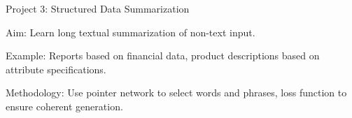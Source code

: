 \documentclass{beamer}
\let\tempone\itemize
\let\temptwo\enditemize
\renewenvironment{itemize}{\tempone\addtolength{\itemsep}{0.5\baselineskip}}{\temptwo}
\newcommand{\air}{\vspace{0.25cm}}
\begin{document}
\begin{frame}{Project 3: Structured Data Summarization}
  \begin{itemize}
    \item Aim: Learn long textual summarization of non-text input. 
    \item Example: Reports based on financial data, product descriptions based on 
      attribute specifications.
    \item Methodology: Use pointer network to select words and phrases, loss function 
      to ensure coherent generation.
  \end{itemize}
\end{frame}

  

  








    

\end{document}
